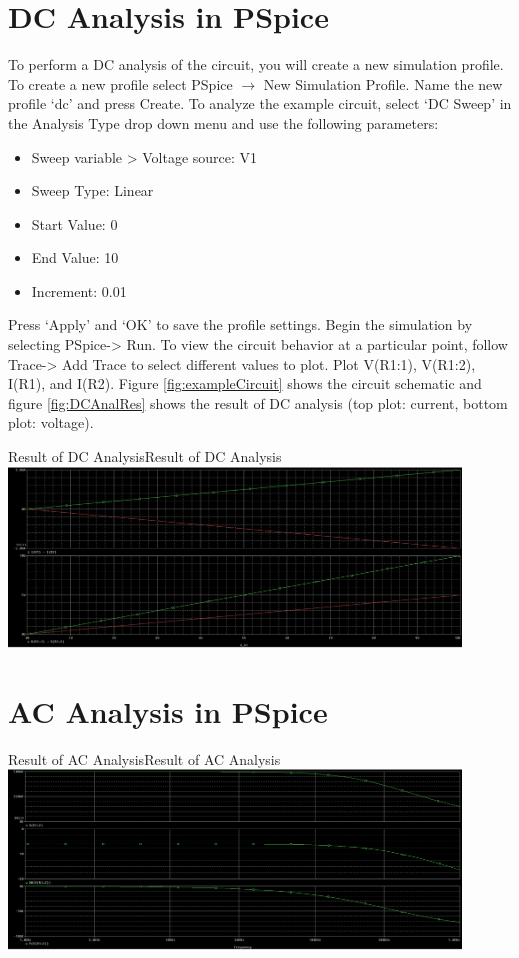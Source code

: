 \documentclass[12pt]{../manual}
\begin{document}
\section{DC Analysis in PSpice}
To perform a DC analysis of the circuit, you will create a new simulation profile. To create a new profile select PSpice $\to$ New Simulation Profile. Name the new profile `dc' and press Create. To analyze the example circuit, select `DC Sweep' in the Analysis Type drop down menu and use the following parameters:
\begin{itemize}
\item Sweep variable > Voltage source: V1
\item Sweep Type: Linear
\item Start Value: 0
\item End Value: 10
\item Increment: 0.01
\end{itemize}
Press `Apply' and `OK' to save the profile settings. Begin the simulation by selecting PSpice-> Run. To view the circuit behavior at a particular point, follow Trace-> Add Trace to select different values to plot. Plot V(R1:1), V(R1:2), I(R1), and I(R2). Figure \ref{fig:exampleCircuit} shows the circuit schematic and figure \ref{fig:DCAnalRes} shows the result of DC analysis (top plot: current, bottom plot: voltage).

\begin{myfigure}[label=fig:DCAnalRes]{Result of DC Analysis}{Result of DC Analysis}
\centering
\includegraphics[width=0.9\textwidth]{figures/ResultDCAnalysisCrop.PNG}
\end{myfigure}

\section{AC Analysis in PSpice}

\begin{myfigure}[label=fig:ACAnalRes]{Result of AC Analysis}{Result of AC Analysis}
\centering
\includegraphics[width=0.9\textwidth]{figures/ResultACAnalysisCrop.PNG}
\end{myfigure}
\end{document}
